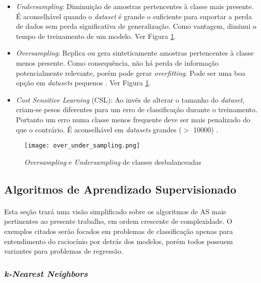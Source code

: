 \begin{itemize}
    \item \textit{Undersampling}: Diminuição de amostras pertencentes à classe mais presente. É aconselhável quando o \textit{dataset} é grande o suficiente para suportar a perda de dados sem perda significativa de generalização. Como vantagem, diminui o tempo de treinamento de um modelo. Ver Figura \ref{fig:7}.
    \item \textit{Oversampling}: Replica ou gera sinteticamente amostras pertencentes à classe menos presente. Como consequência, não há perda de informação potencialmente relevante, porém pode gerar \textit{overfitting}. Pode ser uma boa opção em \textit{datasets} pequenos \cite{weiss2007cost}. Ver Figura \ref{fig:7}.
    \item \textit{Cost Sensitive Learning} (CSL): Ao invés de alterar o tamanho do \textit{dataset}, criam-se pesos diferentes para um erro de classificação durante o treinamento. Portanto um erro numa classe menos frequente deve ser mais penalizado do que o contrário. É aconselhável em \textit{datasets} grandes ($>$ 10000) \cite{weiss2007cost}.
\end{itemize}

\begin{figure}[h]
    \texttt{[image: over\_under\_sampling.png]}
    \centering
    \caption{\textit{Oversampling} e \textit{Undersampling} de classes desbalanceadas \cite{over_under_sampling}}
    \label{fig:7}
\end{figure}


\subsection{Algoritmos de Aprendizado Supervisionado}

\paragraph{} Esta seção trará uma visão simplificado sobre os algoritmos de AS mais pertinentes ao presente trabalho, em ordem crescente de complexidade. O exemplos citados serão focados em problemas de classificação apenas para entendimento do raciocínio por detrás dos modelos, porém todos possuem variantes para problemas de regressão.

\subsubsection*{\textit{k-Nearest Neighbors}}


